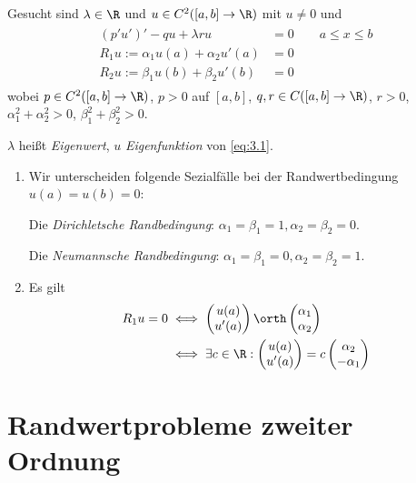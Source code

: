 \begin{df} \label{3.6}
	Gesucht sind $\lambda \in \R$ und $u \in C^2([a,b]\to \R)$ mit $u \neq 0$ und
	\begin{align} \label{eq:3.1}
		\begin{aligned}
		(p'u')' - qu + \lambda ru &= 0 \qquad a\le x \le b \\
		R_1 u := \alpha_1 u(a) + \alpha_2 u'(a) &= 0 \\
		R_2 u := \beta_1 u(b) + \beta_2 u'(b) &= 0
		\end{aligned}
	\end{align}
	wobei $p \in C^2([a,b] \to \R)$, $p > 0$ auf $[a,b]$, $q,r \in C([a,b] \to \R)$, $r>0$, $\alpha_1^2 + \alpha_2^2 > 0$, $\beta_1^2 + \beta_2^2 > 0$.

	$\lambda$ heißt \emph{Eigenwert}, $u$ \emph{Eigenfunktion} von \ref{eq:3.1}.
\end{df}

\begin{nt} \label{3.7}
	\begin{enumerate}[1)]
		\item
			Wir unterscheiden folgende Sezialfälle bei der Randwertbedingung $u(a) = u(b) = 0$:

			Die \emph{Dirichletsche Randbedingung}: $\alpha_1 = \beta_1 = 1, \alpha_2 = \beta_2 = 0$.

			Die \emph{Neumannsche Randbedingung}: $\alpha_1 = \beta_1 = 0, \alpha_2 = \beta_2 = 1$.
		\item
			Es gilt
			\begin{align*}
				R_1 u = 0
				&\iff \begin{pmatrix}
					u(a) \\ u'(a) 
				\end{pmatrix} \orth \begin{pmatrix}
					\alpha_1 \\ \alpha_2
				\end{pmatrix} \\
				&\iff \exists c \in \R : \begin{pmatrix}
					u(a) \\ u'(a)
				\end{pmatrix} = c \begin{pmatrix}
					\alpha_2 \\ -\alpha_1
				\end{pmatrix}
			\end{align*}


	\end{enumerate}
\end{nt}

\section{Randwertprobleme zweiter Ordnung}

